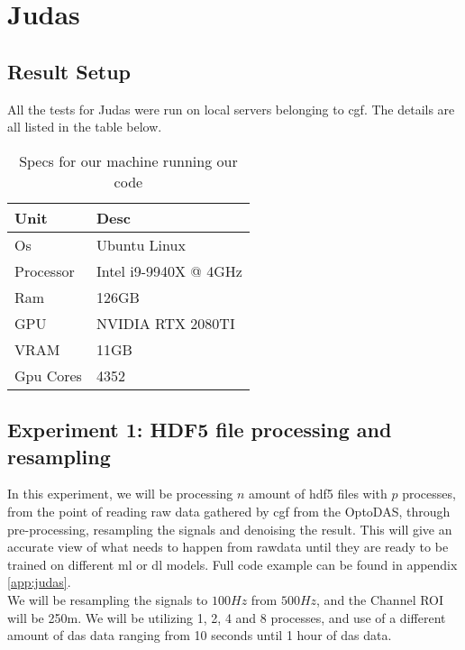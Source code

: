 \section{Judas}
\label{res:Judas}

\subsection{Result Setup}

All the tests for Judas were run on local servers belonging to \acrshort{cgf}. The details are all listed in the table below. \\


\begin{table}[h]
\centering
\begin{tabular}{|l|l|}
\hline
\textbf{Unit} & \textbf{Desc}         \\ \hline
Os            & Ubuntu Linux          \\ \hline
Processor     & Intel i9-9940X @ 4GHz \\ \hline
Ram           & 126GB                 \\ \hline
GPU           & NVIDIA RTX 2080TI     \\ \hline
VRAM          & 11GB                  \\ \hline
Gpu Cores     & 4352                  \\ \hline
\end{tabular}
\label{tab:cgfspecs}
\caption{Specs for our machine running our code}
\end{table}

\subsection{Experiment 1: HDF5 file processing and resampling}

In this experiment, we will be processing $n$ amount of \acrshort{hdf5} files with $p$ processes, from the point of reading raw data gathered by \acrshort{cgf} from the OptoDAS, through pre-processing, resampling the signals and denoising the result. This will give an accurate view of what needs to happen from rawdata until they are ready to be trained on different \acrshort{ml} or \acrshort{dl} models. Full code example can be found in appendix \ref{app:judas}. \\

We will be resampling the signals to $100Hz$ from $500Hz$, and the Channel ROI will be 250m. We will be utilizing 1, 2, 4 and 8 processes, and use of a different amount of \acrshort{das} data ranging from 10 seconds until 1 hour of \acrshort{das} data.



